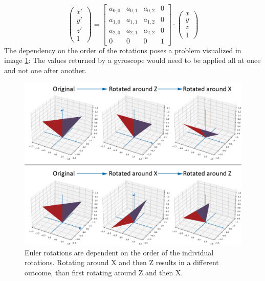 \begin{equation*}
    \begin{pmatrix}
    x'  \\
    y'  \\
    z'  \\
    1
    \end{pmatrix} 
    = 
    \begin{bmatrix}
a_{0,0} & a_{0,1} & a_{0,2} & 0 \\
a_{1,0} & a_{1,1} & a_{1,2} & 0 \\
a_{2,0} & a_{2,1} & a_{2,2} & 0 \\
0 & 0 & 0 & 1
\end{bmatrix}
\cdot 
\begin{pmatrix}
    x  \\
    y  \\
    z  \\
    1
    \end{pmatrix}
\end{equation*}
The dependency on the order of the rotations poses a problem visualized in image \ref{im:EulerRotation}: The values returned by a gyroscope would need to be applied all at once and not one after another. 
\begin{figure}[H]
	\centering
		\includegraphics[width=1.0\textwidth]{images/euler_rotation.png}
	\caption{Euler rotations are dependent on the order of the individual rotations. Rotating around X and then Z results in a different outcome, than first rotating around Z and then X.}
	\label{im:EulerRotation}
\end{figure}
